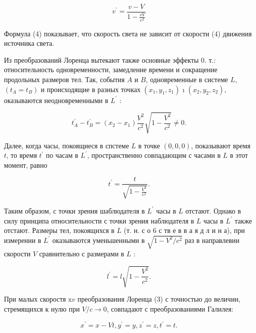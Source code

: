 \documentclass[10pt]{article}
\begin{document}
\[
v^{\prime}=\frac{v-V}{1-\frac{v V}{c^{2}}}
\]

Формула (4) показывает, что скорость света не зависит от скорости (4) движения источника света.

Из преобразований Лоренца вытекают также основные эффекты 0. т.: относительность одновременности, замедление времени и сокращение продольных размеров тел. Так, события $A$ и $B$, одновременные в системе $L$, $\left(t_{A}=t_{B}\right)$ и происходящие в разных точках $\left(x_{1}, y_{1}, z_{1}\right)$ ı $\left(x_{2}, y_{2}, z_{2}\right)$, оказываются неодновременными в $L^{\prime}$ :

\[
t_{A}^{\prime}-t_{B}^{\prime}=\left(x_{2}-x_{1}\right) \frac{V^{2}}{c^{2}} \sqrt{1-\frac{V^{2}}{c^{2}}} \neq 0 .
\]

Далее, когда часы, покоящиеся в спстеме $L$ в точке $(0,0,0)$, показывают время $t$, то время $t^{\prime}$ по часам в $L^{\prime}$, пространственно совпадающим с часами в $L$ в этот момент, равно

\[
t^{\prime}=\frac{t}{\sqrt{1-\frac{V^{2}}{c^{2}}}} .
\]

Таким образом, с точки зрения шаблюдателя в $L^{\prime}$ часы в $L$ отстают. Однако в силу принципа относительности с точки зрения наблюдателя в $L$ часы в $L^{\prime}$ также отстают. Размеры тел, покоящихся в $L$ (т. н. с о 6 с тв е в в а я д л и н а), при измерении в $L^{\prime}$ оказываются уменьшенными в $\sqrt{1-V^{2} / c^{2}}$ раз в направлевии скорости $V$ сравнительно с размерами в $L$ :

\[
l^{\prime}=l \sqrt{1-\frac{V^{2}}{c^{2}}} .
\]

При малых скоростя $\mathrm{x} v$ преобразования Лоренца (3) с точностью до величин, стремящихся к нулю при $V / c \rightarrow 0$, совпадают с преобразованиями Галилея:

\[
x^{\prime}=x-V t, y^{\prime}=y, z^{\prime}=z, t^{\prime}=t .
\]
\end{document}
